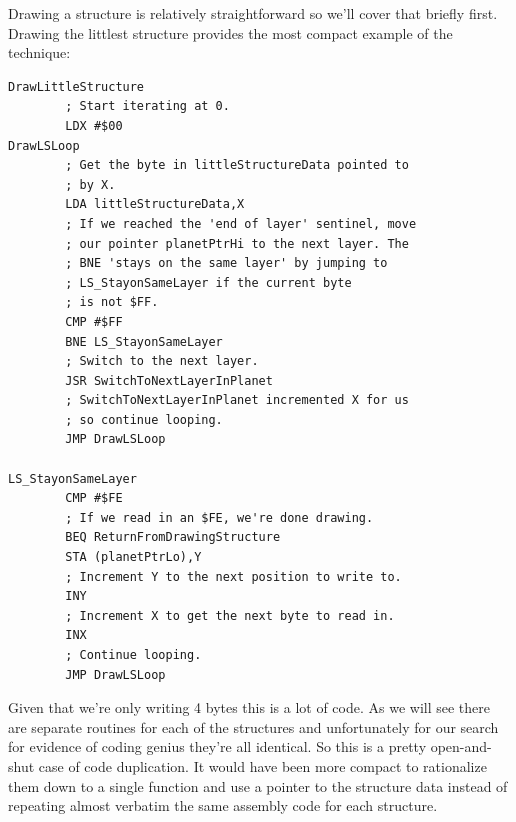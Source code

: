 Drawing a structure is relatively straightforward so we'll cover that briefly first. Drawing the littlest
structure provides the most compact example of the technique:

\begin{lstlisting}[caption=The littlest structure has only two layers.]
DrawLittleStructure
        ; Start iterating at 0.
        LDX #$00
DrawLSLoop
        ; Get the byte in littleStructureData pointed to
        ; by X.
        LDA littleStructureData,X
        ; If we reached the 'end of layer' sentinel, move
        ; our pointer planetPtrHi to the next layer. The
        ; BNE 'stays on the same layer' by jumping to
        ; LS_StayonSameLayer if the current byte
        ; is not $FF.
        CMP #$FF
        BNE LS_StayonSameLayer
        ; Switch to the next layer.
        JSR SwitchToNextLayerInPlanet
        ; SwitchToNextLayerInPlanet incremented X for us
        ; so continue looping.
        JMP DrawLSLoop

LS_StayonSameLayer   
        CMP #$FE
        ; If we read in an $FE, we're done drawing.
        BEQ ReturnFromDrawingStructure
        STA (planetPtrLo),Y
        ; Increment Y to the next position to write to.
        INY
        ; Increment X to get the next byte to read in.
        INX
        ; Continue looping.
        JMP DrawLSLoop
\end{lstlisting}

Given that we're only writing 4 bytes this is a lot of code. As we will see there are separate routines for each
of the structures and unfortunately for our search for evidence of coding genius they're all identical. So this
is a pretty open-and-shut case of code duplication. It would have been more compact to rationalize them down to a single function
and use a pointer to the structure data instead of repeating almost verbatim the same assembly code for each
structure. 

